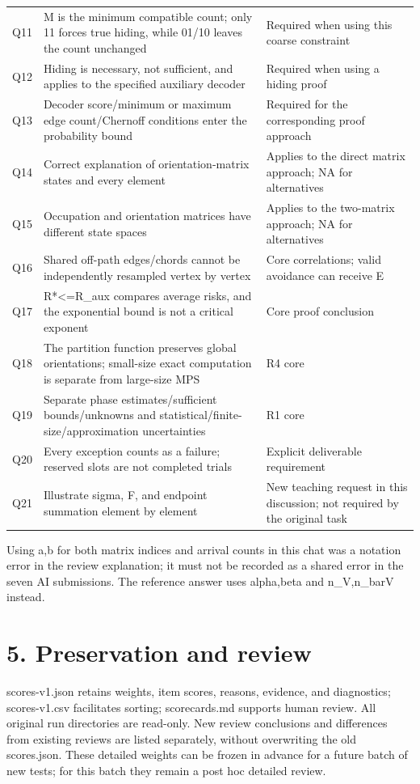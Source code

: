 \documentclass[11pt,a4paper]{article}
\begin{document}
{\begin{longtable}
{}Q11 & M is the minimum compatible count; only 11 forces true hiding, while 01/\allowbreak{}10 leaves the count unchanged & Required when using this coarse constraint\tabularnewline
{}Q12 & Hiding is necessary, not sufficient, and applies to the specified auxiliary decoder & Required when using a hiding proof\tabularnewline
{}Q13 & Decoder score/\allowbreak{}minimum or maximum edge count/\allowbreak{}Chernoff conditions enter the probability bound & Required for the corresponding proof approach\tabularnewline
{}Q14 & Correct explanation of orientation-matrix states and every element & Applies to the direct matrix approach; NA for alternatives\tabularnewline
{}Q15 & Occupation and orientation matrices have different state spaces & Applies to the two-matrix approach; NA for alternatives\tabularnewline
{}Q16 & Shared off-path edges/\allowbreak{}chords cannot be independently resampled vertex by vertex & Core correlations; valid avoidance can receive E\tabularnewline
{}Q17 & R*<=R\_aux compares average risks, and the exponential bound is not a critical exponent & Core proof conclusion\tabularnewline
{}Q18 & The partition function preserves global orientations; small-size exact computation is separate from large-size MPS & R4 core\tabularnewline
{}Q19 & Separate phase estimates/\allowbreak{}sufficient bounds/\allowbreak{}unknowns and statistical/\allowbreak{}finite-size/\allowbreak{}approximation uncertainties & R1 core\tabularnewline
{}Q20 & Every exception counts as a failure; reserved slots are not completed trials & Explicit deliverable requirement\tabularnewline
{}Q21 & Illustrate sigma, F, and endpoint summation element by element & New teaching request in this discussion; not required by the original task\tabularnewline
\bottomrule
\end{longtable}
}

Using a,b for both matrix indices and arrival counts in this chat was a notation error in the review explanation; it must not be recorded as a shared error in the seven AI submissions. The reference answer uses alpha,beta and n\_V,n\_barV instead.

\section*{5. Preservation and review}

scores-v1.json retains weights, item scores, reasons, evidence, and diagnostics; scores-v1.csv facilitates sorting; scorecards.md supports human review. All original run directories are read-only. New review conclusions and differences from existing reviews are listed separately, without overwriting the old scores.json. These detailed weights can be frozen in advance for a future batch of new tests; for this batch they remain a post hoc detailed review.
\clearpage
\end{document}
